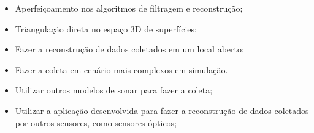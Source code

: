 \vspace{0,5em}
\begin{itemize}
    \item Aperfeiçoamento nos algoritmos de filtragem e reconstrução;
    \item Triangulação direta no espaço 3D de superfícies;
    \item Fazer a reconstrução de dados coletados em um local aberto;
    \item Fazer a coleta em cenário mais complexos em simulação.
    \item Utilizar outros modelos de sonar para fazer a coleta;
    \item Utilizar a aplicação desenvolvida para fazer a reconstrução de dados coletados por outros sensores, como sensores ópticos;
\end{itemize}